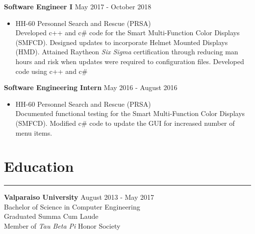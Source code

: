 \documentclass[10pt, letterpaper]{article}
\begin{document}
\textbf{Software Engineer I} \hfill May 2017 - October 2018 \\
\vspace{-4ex}
\begin{itemize}[noitemsep]
    \item HH-60 Personnel Search and Rescue (PRSA) \\
    Developed c++ and c\# code for the Smart Multi-Function Color Displays (SMFCD). Designed updates to incorporate Helmet Mounted Displays (HMD). Attained Raytheon \emph{Six Sigma} certification through reducing man hours and risk when updates were required to configuration files.
    Developed code using c++ and c\#
\end{itemize}


\textbf{Software Engineering Intern} \hfill May 2016 - August 2016 \\
\vspace{-4ex}
\begin{itemize}[noitemsep]
    \item HH-60 Personnel Search and Rescue (PRSA) \\
    Documented functional testing for the Smart Multi-Function Color Displays (SMFCD). Modified c\# code to update the GUI for increased number of menu items.
\end{itemize}


\vspace{-2ex}
\section*{Education} \vspace{-2ex} \hrule
\vspace{1ex}

\textbf{Valparaiso University} \hfill August 2013 - May 2017 \\
\indent Bachelor of Science in Computer Engineering \\
\indent \indent Graduated Summa Cum Laude \\
\indent \indent Member of \emph{Tau Beta Pi} Honor Society
\end{document}
